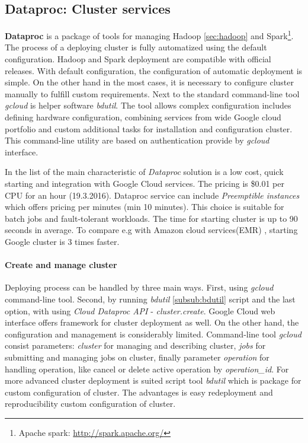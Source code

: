 \documentclass[a4paper,12pt,oneside]{report}
\begin{document}
	
	
	\subsection{Dataproc: Cluster services}
	\label{subsub:dataproc}
	\textbf{Dataproc} is a package of tools for managing Hadoop \ref{sec:hadoop} 
	and Spark\footnote{Apache spark: \url{http://spark.apache.org/}}.
	The process of a deploying cluster is fully automatized using the default 
	configuration. Hadoop and Spark deployment are compatible with official
	releases. With default configuration, the configuration of automatic deployment is simple. 
	On the other hand in the most cases, it is 
	necessary to configure cluster manually to fulfill custom requirements. 
	Next to the standard command-line tool \textit{gcloud} is 
	helper software \emph{bdutil}.  The tool  allows complex 
	configuration includes 
	defining hardware configuration, combining services from wide Google cloud 
	portfolio and custom additional tasks for installation and configuration
	cluster. 
	This command-line utility are based on authentication provide by \textit{gcloud}
	interface.
	
	In the list of the main characteristic of \textit{Dataproc} solution is a 
	low cost, quick starting and integration with Google Cloud services. 
	The pricing is  \$0.01 per CPU for an hour (19.3.2016). Dataproc service can 
	include \textit{Preemptible instances} which offers pricing 
	per minutes (min 10 minutes). This choice is suitable for batch jobs and 
	fault-tolerant workloads. The time for starting cluster is up to 
	90 seconds in average. To compare e.g with Amazon cloud
	services(EMR) \cite{amazon_emr}, starting Google cluster is 3 times faster.
	
	\paragraph{Create and manage cluster} Deploying process can be handled by three
	main ways. First, using \textit{gcloud} command-line tool. Second, by running
	\textit{bdutil} \ref{subsub:bdutil} script and the last option, with using 
	\textit{Cloud Dataproc API} - \textit{cluster.create}. Google Cloud web
	interface offers framework for cluster deployment as well. On the other hand,
	the configuration and management is considerably limited. Command-line tool
	\textit{gcloud} consist parameters: \textit{cluster} for managing and describing
	cluster, \textit{jobs} for submitting 	and managing jobs on cluster, finally parameter
	\textit{operation} for handling operation, like cancel or delete active 
	operation by \emph{operation\_id}. For more advanced cluster deployment is	
	suited script tool \textit{bdutil} which is 
	package for custom configuration of cluster. The advantages is easy
	redeployment and	reproducibility custom	configuration of cluster. 
	
\end{document}
